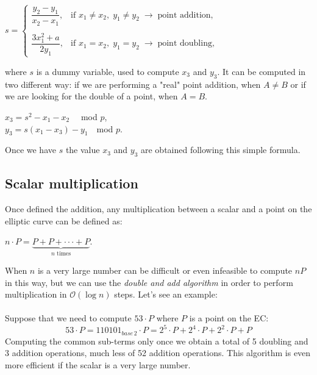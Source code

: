 \begin{center} 
	$s=\begin{cases} \dfrac{y_2-y_1}{x_2-x_1}, & \mbox{if } x_1\neq x_2, \; y_1\neq y_2 \;\rightarrow \; \text{point addition},\\ \\ \dfrac{3x_1^2+a}{2y_1}, & \mbox{if } x_1= x_2, \; y_1= y_2 \;\rightarrow \; \text{point doubling}, \end{cases}$
\end{center}
where $s$ is a dummy variable, used to compute $x_3$ and $y_3$. It can be computed in two different way: if we are performing a "real" point addition, when $A\neq B$ or if we are looking for the double of a point, when $A= B$.
\begin{center} 
	$ x_3=s^2-x_1-x_2  \quad$ mod $p$,\\
	$y_3=s(x_1-x_3)-y_1  \quad$mod $p$.
\end{center}
Once we have $s$ the value $x_3$ and $y_3$ are obtained following this simple formula.


\subsection{Scalar multiplication}
Once defined the addition, any multiplication between a scalar and a point on the elliptic curve can be defined as:
\begin{center} 
	$ n \cdot P=\underbrace{
		P+P+\cdot \cdot \cdot+P
	}_{n\text{ times}}$.
\end{center}
When $n$ is a very large number can be difficult or even infeasible to compute $nP$ in this way, but we can use the \textit{double and add algorithm} in order to perform multiplication in $\mathcal{O}(\log{}n)$ steps. Let's see an example:
\\ \\
Suppose that we need to compute $53 \cdot P$ where $P$ is a point on the EC:
\begin{equation*}
53 \cdot P = 110101_{base\, 2} \cdot P = 2^{5}\cdot P + 2^{4}\cdot P + 2^{2}\cdot P + P
\end{equation*}
Computing the common sub-terms only once we obtain a total of 5 doubling and 3 addition operations, much less of 52 addition operations. This algorithm is even more efficient if the scalar is a very large number.

